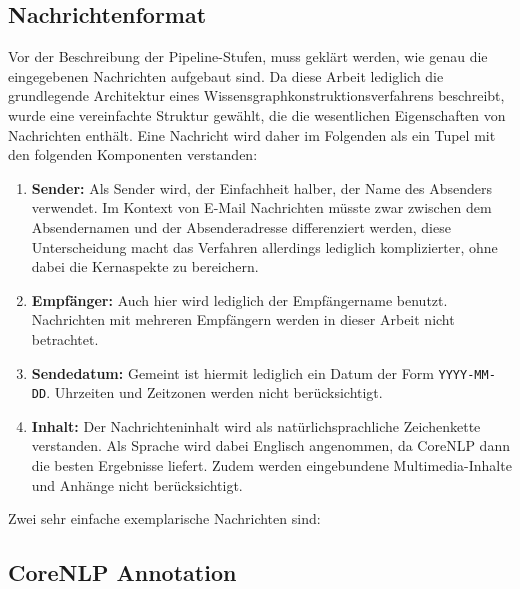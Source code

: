 \subsection{Nachrichtenformat}%
\label{sec:text2kg:nlp:msg}

Vor der Beschreibung der Pipeline-Stufen, muss geklärt werden, wie genau die eingegebenen Nachrichten aufgebaut sind.
Da diese Arbeit lediglich die grundlegende Architektur eines Wissensgraphkonstruktionsverfahrens beschreibt, wurde eine vereinfachte Struktur gewählt, die die wesentlichen Eigenschaften von Nachrichten enthält.
Eine Nachricht wird daher im Folgenden als ein Tupel mit den folgenden Komponenten verstanden:
\begin{enumerate}
	\item \textbf{Sender:}
		Als Sender wird, der Einfachheit halber, der Name des Absenders verwendet.
		Im Kontext von E-Mail Nachrichten müsste zwar zwischen dem Absendernamen und der Absenderadresse differenziert werden, diese Unterscheidung macht das Verfahren allerdings lediglich komplizierter, ohne dabei die Kernaspekte zu bereichern.
	\item \textbf{Empfänger:}
		Auch hier wird lediglich der Empfängername benutzt.
		Nachrichten mit mehreren Empfängern werden in dieser Arbeit nicht betrachtet.
	\item \textbf{Sendedatum:}
		Gemeint ist hiermit lediglich ein Datum der Form \texttt{YYYY-MM-DD}.
		Uhrzeiten und Zeitzonen werden nicht berücksichtigt.
	\item \textbf{Inhalt:}
		Der Nachrichteninhalt wird als natürlichsprachliche Zeichenkette verstanden.
		Als Sprache wird dabei Englisch angenommen, da CoreNLP dann die besten Ergebnisse liefert.
		Zudem werden eingebundene Multimedia-Inhalte und Anhänge nicht berücksichtigt.
\end{enumerate}

Zwei sehr einfache exemplarische Nachrichten sind:
\begin{center}\end{center}

\subsection{CoreNLP Annotation}%
\label{sec:text2kg:nlp:corenlp}

